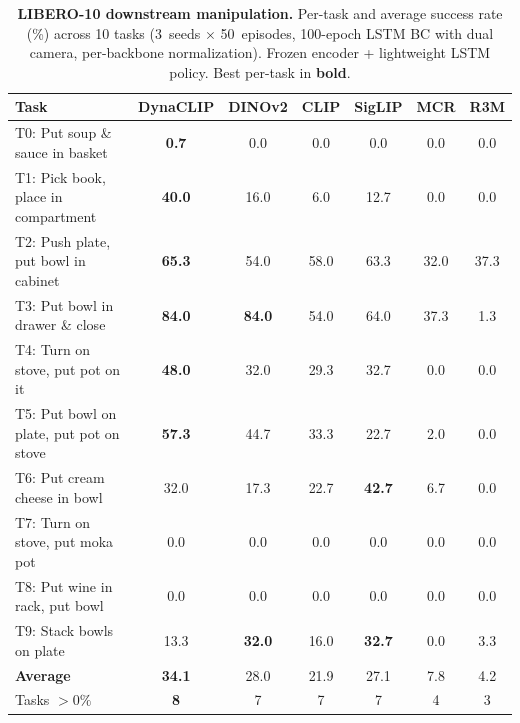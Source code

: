 \documentclass{article}
\newcommand{\methodname}{DynaCLIP}
\begin{document}
\begin{table}[h]
\centering
\caption{\textbf{LIBERO-10 downstream manipulation.} Per-task and average success rate (\%) across 10 tasks (3~seeds $\times$ 50~episodes, 100-epoch LSTM BC with dual camera, per-backbone normalization). Frozen encoder + lightweight LSTM policy. Best per-task in \textbf{bold}.}
\label{tab:libero10}
\small
\setlength{\tabcolsep}{3.5pt}
\begin{tabular}{lcccccc}
\toprule
Task & \textbf{\methodname{}} & DINOv2 & CLIP & SigLIP & MCR & R3M \\
\midrule
T0: Put soup \& sauce in basket & \textbf{0.7} & 0.0 & 0.0 & 0.0 & 0.0 & 0.0 \\
T1: Pick book, place in compartment & \textbf{40.0} & 16.0 & 6.0 & 12.7 & 0.0 & 0.0 \\
T2: Push plate, put bowl in cabinet & \textbf{65.3} & 54.0 & 58.0 & 63.3 & 32.0 & 37.3 \\
T3: Put bowl in drawer \& close & \textbf{84.0} & \textbf{84.0} & 54.0 & 64.0 & 37.3 & 1.3 \\
T4: Turn on stove, put pot on it & \textbf{48.0} & 32.0 & 29.3 & 32.7 & 0.0 & 0.0 \\
T5: Put bowl on plate, put pot on stove & \textbf{57.3} & 44.7 & 33.3 & 22.7 & 2.0 & 0.0 \\
T6: Put cream cheese in bowl & 32.0 & 17.3 & 22.7 & \textbf{42.7} & 6.7 & 0.0 \\
T7: Turn on stove, put moka pot & 0.0 & 0.0 & 0.0 & 0.0 & 0.0 & 0.0 \\
T8: Put wine in rack, put bowl & 0.0 & 0.0 & 0.0 & 0.0 & 0.0 & 0.0 \\
T9: Stack bowls on plate & 13.3 & \textbf{32.0} & 16.0 & \textbf{32.7} & 0.0 & 3.3 \\
\midrule
\textbf{Average} & \textbf{34.1} & 28.0 & 21.9 & 27.1 & 7.8 & 4.2 \\
Tasks $> 0\%$ & \textbf{8} & 7 & 7 & 7 & 4 & 3 \\
\bottomrule
\end{tabular}
\end{table}
\end{document}
